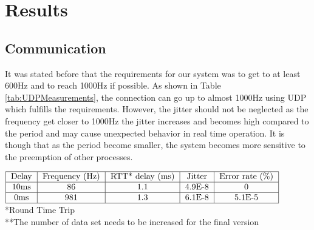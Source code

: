 \section{Results}

\subsection{Communication}

 It was stated before that the requirements for our system was to get to at least 600Hz and to reach 1000Hz if possible. As shown in Table \ref{tab:UDPMeasurements}, the connection can go up to almost 1000Hz using UDP which fulfills the requirements. However, the jitter should not be neglected as the frequency get closer to 1000Hz the jitter increases and becomes high compared to the period and may cause unexpected behavior in real time operation. It is though that as the period become smaller, the system becomes more sensitive to the preemption of other processes.
\begin{table}[h]
  $\begin{tabular}{|c|c|c|c|c|c|}
    \hline
    \text{Delay} & \text{Frequency (Hz)} & \text{RTT* delay (ms)} & \text{Jitter} & \text{Error rate (\%)}\\
    \hline
    10ms & 86 & 1.1 & 4.9E-8 & 0 \\
    \hline
    0ms & 981 & 1.3 & 6.1E-8 & 5.1E-5 \\
    \hline
  \end{tabular}$
  *Round Time Trip\\
  **The number of data set needs to be increased for the final version
  \caption{UDP**}
  \label{tab:UDPMeasurements}
\end{table}



%     
%     





